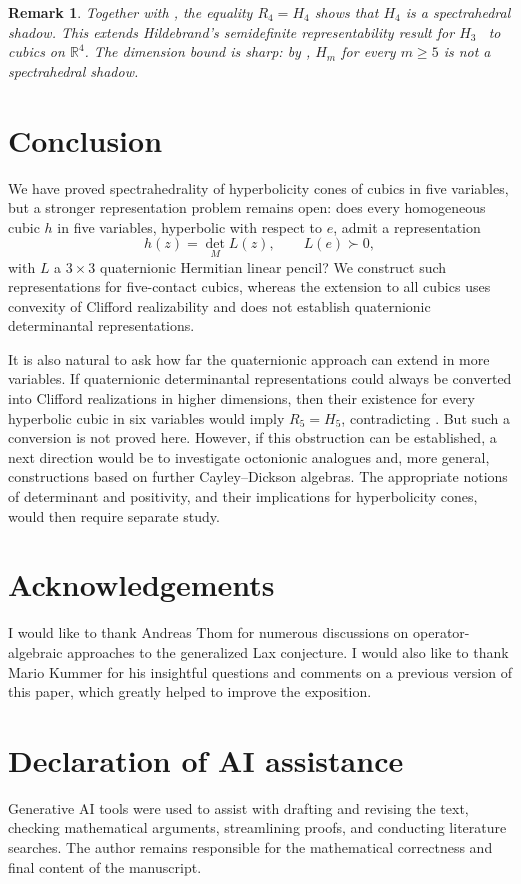 \documentclass[11pt,onecolumn]{article}
\theoremstyle{blueplain}
\theoremstyle{bluedefinition}
\theoremstyle{bluedefinition}
\newtheorem{remark}[remark]{Remark}
\newcommand{\R}{\mathbb R}
\begin{document}
\begin{remark}
Together with , the equality $R_4=H_4$ shows that
$H_4$ is a spectrahedral shadow. This extends Hildebrand's
semidefinite representability result for $H_3$~\cite{Hildebrand}
to cubics on $\R^4$. The dimension bound is sharp: by
,  $H_m$ for every
$m\geqslant5$ is not a spectrahedral shadow.
\end{remark}

\section{Conclusion}

We have proved spectrahedrality of hyperbolicity cones of cubics in five
variables, but a stronger representation problem remains open:
does every homogeneous cubic $h$ in five variables, hyperbolic with respect
to $e$, admit a representation
\[
 h(z)=\det_M L(z),\qquad L(e)\succ0,
\]
with $L$ a $3\times3$ quaternionic Hermitian linear pencil?
We construct such representations for five-contact cubics, whereas the
extension to all cubics uses convexity of Clifford realizability and does
not establish quaternionic determinantal representations.

It is also natural to ask how far the quaternionic approach can extend
in more variables.  If quaternionic determinantal representations could
always be converted into Clifford realizations in higher dimensions,
then their existence for every hyperbolic cubic in six variables would
imply $R_5=H_5$, contradicting .  But such a conversion is not proved here.  However, if this obstruction
can be established, a next direction would be to investigate octonionic
analogues and, more general, constructions based on further
Cayley--Dickson algebras.  The appropriate notions of determinant and
positivity, and their implications for hyperbolicity cones, would then
require separate study.

\section*{Acknowledgements}
I would like to thank Andreas Thom for numerous discussions on
operator-algebraic approaches to the generalized Lax conjecture. I would also like to thank Mario Kummer for his
insightful questions and comments on a previous version of this paper,
which greatly helped to improve the exposition.

\section*{Declaration of AI assistance}
Generative AI tools were used to assist with drafting and revising the
text, checking mathematical arguments, streamlining proofs, and conducting
literature searches.  The author remains
responsible for the mathematical correctness and final content of the
manuscript.
\end{document}
